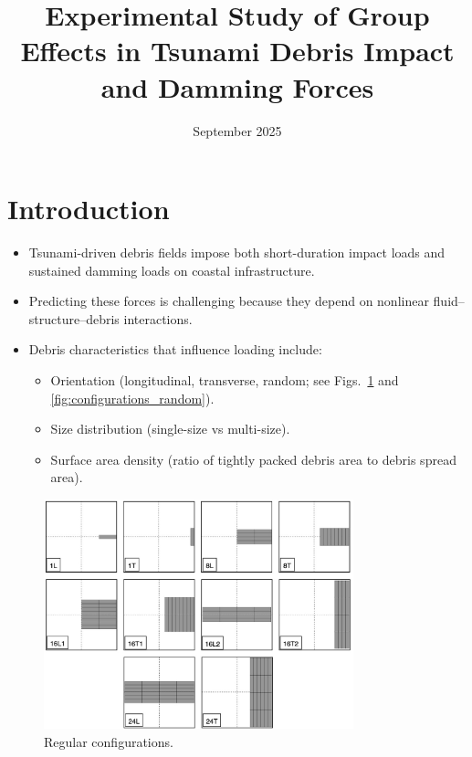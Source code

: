 \documentclass{article}
\title{Experimental Study of Group Effects in Tsunami Debris Impact and Damming Forces}
\date{September 2025}
\begin{document}
\maketitle

\section{Introduction}
\begin{itemize}
    \item Tsunami-driven debris fields impose both short-duration impact loads and sustained damming loads on coastal infrastructure.
    \item Predicting these forces is challenging because they depend on  nonlinear fluid--structure--debris interactions.
    \item Debris characteristics that influence loading include:
    \begin{itemize}
        \item Orientation (longitudinal, transverse, random; see Figs.~\ref{fig:configurations} and \ref{fig:configurations_random}).
        \item Size distribution (single-size vs multi-size).
        \item Surface area density (ratio of tightly packed debris area to debris spread area).
    \end{itemize}

\end{itemize}

\begin{figure}[htbp]
    \centering
    \includegraphics[width=0.8\textwidth]{Configurations.jpg}
    \caption{Regular configurations.}
    \label{fig:configurations}
\end{figure}
\end{document}
